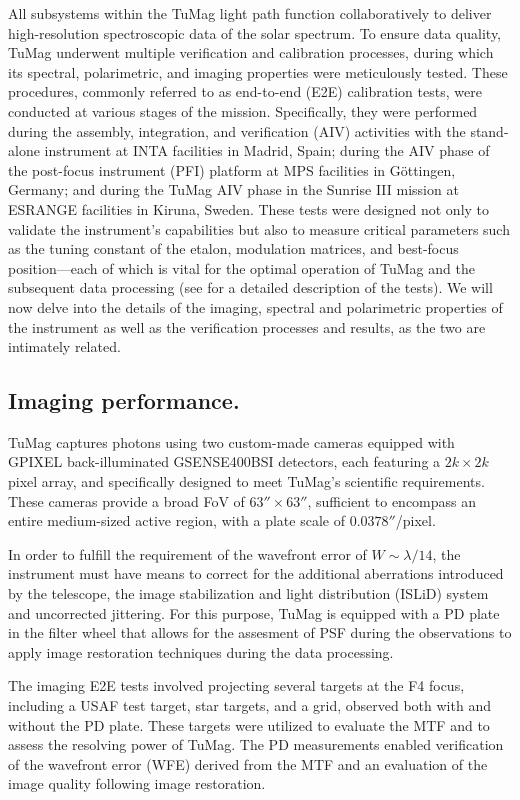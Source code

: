 All subsystems within the TuMag light path function collaboratively to deliver high-resolution spectroscopic data of the solar spectrum. To ensure data quality, TuMag underwent multiple verification and calibration processes, during which its spectral, polarimetric, and imaging properties were meticulously tested. These procedures, commonly referred to as end-to-end (E2E) calibration tests, were conducted at various stages of the mission. Specifically, they were performed during the assembly, integration, and verification (AIV) activities with the stand-alone instrument at INTA facilities in Madrid, Spain; during the AIV phase of the post-focus instrument (PFI) platform at MPS facilities in Göttingen, Germany; and during the TuMag AIV phase in the Sunrise III mission at ESRANGE facilities in Kiruna, Sweden. These tests were designed not only to validate the instrument's capabilities but also to measure critical parameters such as the tuning constant of the etalon, modulation matrices, and best-focus position—each of which is vital for the optimal operation of TuMag and the subsequent data processing (see \cite{e2e-tests-inta} for a detailed description of the tests). We will now delve into the details of the imaging, spectral and polarimetric properties of the instrument as well as the verification processes and results, as the two are intimately related.  

\subsection{Imaging performance.}
TuMag captures photons using two custom-made cameras \citep{tumag-cams} equipped with GPIXEL back-illuminated GSENSE400BSI detectors, each featuring a $2k \times 2k$ pixel array, and specifically designed to meet TuMag's scientific requirements. These cameras provide a broad FoV of $63'' \times 63''$, sufficient to encompass an entire medium-sized active region, with a plate scale of $0.0378''$/pixel.

In order to fulfill the requirement of the wavefront error of $W \sim \lambda / 14$, the instrument must have means to correct for the additional aberrations introduced by the telescope, the image stabilization and light distribution (ISLiD) system and uncorrected jittering. For this purpose, TuMag is equipped with a PD plate in the filter wheel that allows for the assesment of PSF during the observations to apply image restoration techniques during the data processing.  

The imaging E2E tests involved projecting several targets at the F4 focus, including a USAF test target, star targets, and a grid, observed both with and without the PD plate. These targets were utilized to evaluate the MTF and to assess the resolving power of TuMag. The PD measurements enabled verification of the wavefront error (WFE) derived from the MTF and an evaluation of the image quality following image restoration. 

